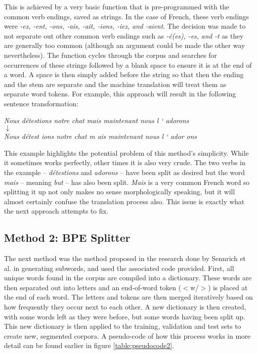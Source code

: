 \documentclass[11pt]{article}
\begin{document}
This is achieved by a very basic function that is pre-programmed with the common verb endings, saved as strings. In the case of French, these verb endings were \textit{-ez, -ent, -ons, -ais, -ait, -ions, -iez, and -aient}. The decision was made to not separate out other common verb endings such as \textit{-é(es), -es, and -t} as they are generally too common (although an argument could be made the other way nevertheless). The function cycles through the corpus and searches for occurrences of these strings followed by a blank space to ensure it is at the end of a word. A space is then simply added before the string so that then the ending and the stem are separate and the machine translation will treat them as separate word tokens. For example, this approach will result in the following sentence transformation:

\bigskip
\begin{center}
\textit{Nous détestions notre chat mais maintenant nous l ‘ adorons} \\
\medskip
$\downarrow$ \\
\medskip
\textit{Nous détest ions notre chat m ais maintenant nous l ‘ ador ons}
\end{center}
\bigskip

This example highlights the potential problem of this method’s simplicity. While it sometimes works perfectly, other times it is also very crude. The two verbs in the example -- \textit{détestions} and \textit{adorons} -- have been split as desired but the word \textit{mais} -- meaning \textit{but} -- has also been split. \textit{Mais} is a very common French word so splitting it up not only makes no sense morphologically speaking, but it will almost certainly confuse the translation process also. This issue is exactly what the next approach attempts to fix.

\subsection{Method 2: BPE Splitter}

The next method was the method proposed in the research done by Sennrich et al. \citeyearpar{sennrich-etal-2016-neural} in generating subwords, and used the associated code provided. First, all unique words found in the corpus are compiled into a dictionary. These words are then separated out into letters and an end-of-word token ($<$w/$>$) is placed at the end of each word. The letters and tokens are then merged iteratively based on how frequently they occur next to each other. A new dictionary is then created, with some words left as they were before, but some words having been split up. This new dictionary is then applied to the training, validation and test sets to create new, segmented corpora. A pseudo-code of how this process works in more detail can be found earlier in figure \ref{table:pseudocode2}.
\end{document}
